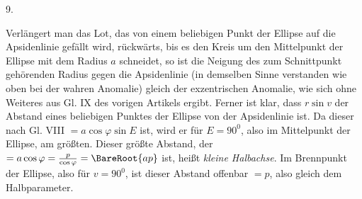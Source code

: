 \par{}
\begin{center}
9.
\end{center}
Verlängert man das Lot, das von einem beliebigen Punkt der Ellipse auf die
Apsidenlinie gefällt wird, rückwärts, bis es den Kreis um den Mittelpunkt der Ellipse
mit dem Radius $a$ schneidet, so ist die Neigung des zum Schnittpunkt gehörenden Radius
gegen die Apsidenlinie (in demselben Sinne verstanden wie oben bei der wahren Anomalie)
gleich der exzentrischen Anomalie, wie sich ohne Weiteres aus Gl. IX des vorigen Artikels
ergibt. Ferner ist klar, dass $r\sin v$ der Abstand eines beliebigen Punktes der
Ellipse von der Apsidenlinie ist. Da dieser nach Gl. VIII $= a\cos\varphi\sin E$ ist,
wird er für $E = 90^0$, also im Mittelpunkt der Ellipse, am größten. Dieser größte
Abstand, der $= a\cos\varphi = \frac{p}{\cos\varphi} = \BareRoot{ap}$ ist, heißt
\emph{kleine Halbachse}. Im Brennpunkt der Ellipse, also für $v = 90^0$, ist dieser
Abstand offenbar $= p$, also gleich dem Halbparameter.
